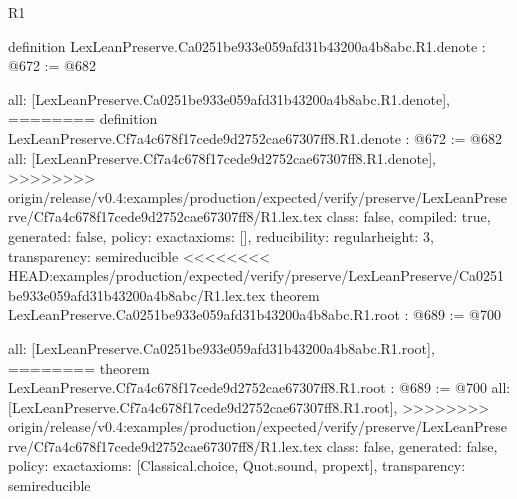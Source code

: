 \begin{lexlean}{R1}
\begin{coremodule}
{{{{{{definition LexLeanPreserve.Ca0251be933e059afd31b43200a4b8abc.R1.denote : @672 := @682 {
  all: [LexLeanPreserve.Ca0251be933e059afd31b43200a4b8abc.R1.denote],
========
definition LexLeanPreserve.Cf7a4c678f17cede9d2752cae67307ff8.R1.denote : @672 := @682 {
  all: [LexLeanPreserve.Cf7a4c678f17cede9d2752cae67307ff8.R1.denote],
>>>>>>>> origin/release/v0.4:examples/production/expected/verify/preserve/LexLeanPreserve/Cf7a4c678f17cede9d2752cae67307ff8/R1.lex.tex
  class: false,
  compiled: true,
  generated: false,
  policy: exact{axioms: []},
  reducibility: regular{height: 3},
  transparency: semireducible
}
<<<<<<<< HEAD:examples/production/expected/verify/preserve/LexLeanPreserve/Ca0251be933e059afd31b43200a4b8abc/R1.lex.tex
theorem LexLeanPreserve.Ca0251be933e059afd31b43200a4b8abc.R1.root : @689 := @700 {
  all: [LexLeanPreserve.Ca0251be933e059afd31b43200a4b8abc.R1.root],
========
theorem LexLeanPreserve.Cf7a4c678f17cede9d2752cae67307ff8.R1.root : @689 := @700 {
  all: [LexLeanPreserve.Cf7a4c678f17cede9d2752cae67307ff8.R1.root],
>>>>>>>> origin/release/v0.4:examples/production/expected/verify/preserve/LexLeanPreserve/Cf7a4c678f17cede9d2752cae67307ff8/R1.lex.tex
  class: false,
  generated: false,
  policy: exact{axioms: [Classical.choice, Quot.sound, propext]},
  transparency: semireducible
}

}}}}}}}}
\end{coremodule}
\end{lexlean}
